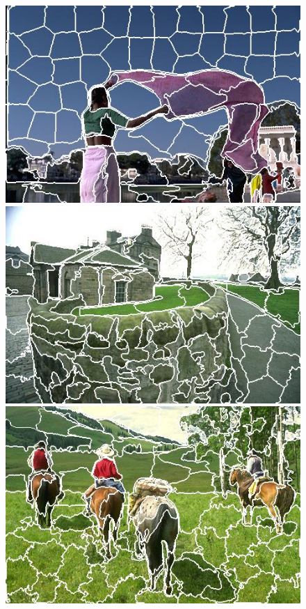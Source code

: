 \begin{figure}[h]
{\begin{minipage}[b]{0.13\linewidth}
\includegraphics[width=1\linewidth]{figures/img/ours_sp/ourssp_80085.jpg}
\includegraphics[width=1\linewidth]{figures/img/ours_sp/ourssp_92014.jpg}
\includegraphics[width=1\linewidth]{figures/img/ours_sp/ourssp_220003.jpg}

\end{minipage}}
\end{figure}
